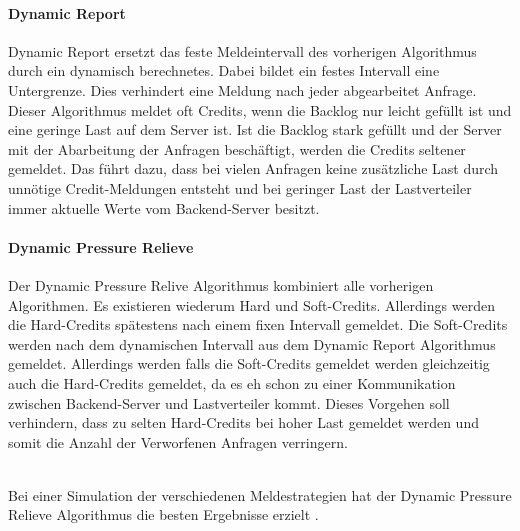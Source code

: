 \documentclass[a4paper, 12pt, BCOR10mm, DIV12, toc=bibliography, toc=listof, german]{scrbook}
\begin{document}

	\paragraph{Dynamic Report} %
	\label{par:dynamic-report}

	Dynamic Report ersetzt das feste Meldeintervall des vorherigen Algorithmus durch ein dynamisch
	berechnetes. Dabei bildet ein festes Intervall eine Untergrenze. Dies verhindert eine Meldung nach
	jeder abgearbeitet Anfrage. Dieser Algorithmus meldet oft Credits, wenn die Backlog nur leicht
	gefüllt ist und eine geringe Last	auf dem Server ist. Ist die Backlog stark gefüllt und der
	Server mit der Abarbeitung der Anfragen beschäftigt, werden die Credits seltener gemeldet. Das
	führt dazu, dass bei vielen Anfragen keine zusätzliche Last durch unnötige Credit-Meldungen entsteht
	und bei geringer Last der Lastverteiler immer aktuelle Werte vom Backend-Server besitzt.


	\paragraph{Dynamic Pressure Relieve} %
	\label{par:dynamic-pressure-relieve}

	Der Dynamic Pressure Relive Algorithmus kombiniert alle vorherigen Algorithmen. Es existieren
	wiederum Hard und Soft-Credits. Allerdings werden die Hard-Credits spätestens nach einem fixen
	Intervall gemeldet. Die Soft-Credits werden nach dem dynamischen Intervall aus dem Dynamic Report
	Algorithmus gemeldet. Allerdings werden falls die Soft-Credits gemeldet werden gleichzeitig auch
	die Hard-Credits gemeldet, da es eh schon zu einer Kommunikation zwischen Backend-Server und
	Lastverteiler kommt. Dieses Vorgehen soll verhindern, dass zu selten Hard-Credits bei hoher Last
	gemeldet werden und somit die Anzahl der Verworfenen Anfragen verringern.

$~$\\

	Bei einer Simulation der verschiedenen Meldestrategien hat der Dynamic Pressure Relieve
	Algorithmus die besten Ergebnisse erzielt \cite{scsczile2008}.
\end{document}
